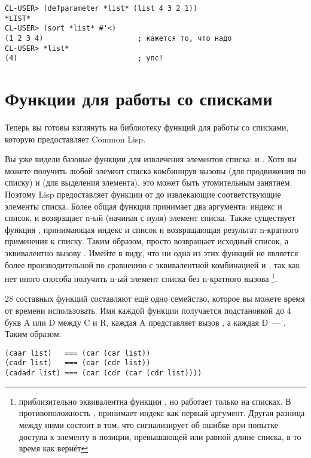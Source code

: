 \begin{lstlisting}
CL-USER> (defparameter *list* (list 4 3 2 1))
*LIST*
CL-USER> (sort *list* #'<)
(1 2 3 4)                      ; кажется то, что надо
CL-USER> *list*
(4)                            ; упс!
\end{lstlisting}


\section{Функции для работы со списками}
\label{sec:12-list-funcs}

Теперь вы готовы взглянуть на библиотеку функций для работы со списками, которую
предоставляет Common Lisp.

Вы уже видели базовые функции для извлечения элементов списка:  и
. Хотя вы можете получить любой элемент списка комбинируя вызовы 
(для продвижения по списку) и  (для выделения элемента), это может быть
утомительным занятием. Поэтому Lisp предоставляет функции от  до 
извлекающие соответствующие элементы списка. Более общая функция  принимает два
аргумента: индекс и список, и возвращает n-ый (начиная с нуля) элемент списка. Также
существует функция , принимающая индекс и список и возвращающая результат
n-кратного применения  к списку. Таким образом,   просто
возвращает исходный список, а   эквивалентно вызову
. Имейте в виду, что ни одна из этих функций не является более производительной
по сравнению с эквивалентной комбинацией  и , так как нет иного
способа получить n-ый элемент списка без n-кратного вызова \footnote{
  приблизительно эквивалентна функции , но работает только на списках. В
  противоположность ,  принимает индекс как первый аргумент. Другая
  разница между ними состоит в том, что  сигнализирует об ошибке при попытке
  доступа к элементу в позиции, превышающей или равной длине списка, в то время как
   вернёт }.

28 составных  функций составляют ещё одно семейство, которое вы можете время
от времени использовать. Имя каждой функции получается подстановкой до 4 букв A или D
между C и R, каждая A представляет вызов , а каждая D~--- . Таким
образом:

\begin{lstlisting}
(caar list)   === (car (car list))
(cadr list)   === (car (cdr list))
(cadadr list) === (car (cdr (car (cdr list))))
\end{lstlisting}

